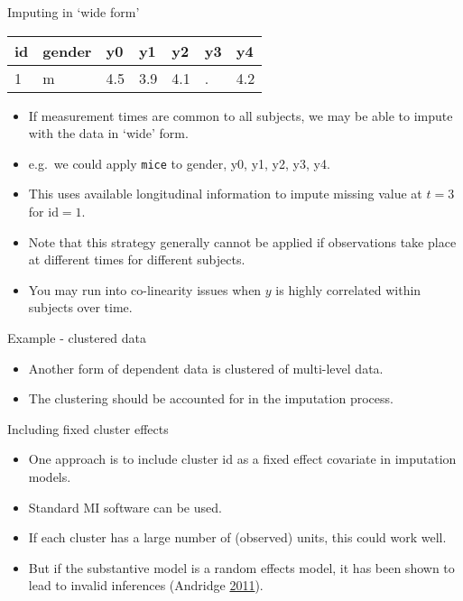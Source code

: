 \documentclass[ignorenonframetext,]{beamer}
\providecommand{\tightlist}{%
  \setlength{\itemsep}{0pt}\setlength{\parskip}{0pt}}
\begin{document}
\begin{frame}[fragile]{Imputing in `wide form'}
\protect\hypertarget{imputing-in-wide-form}{}

\begin{longtable}[]{@{}lllllll@{}}
\toprule
id & gender & y0 & y1 & y2 & y3 & y4\tabularnewline
\midrule
\endhead
1 & m & 4.5 & 3.9 & 4.1 & . & 4.2\tabularnewline
\bottomrule
\end{longtable}

\begin{itemize}
\tightlist
\item
  If measurement times are common to all subjects, we may be able to
  impute with the data in `wide' form.
\item
  e.g.~we could apply \texttt{mice} to gender, y0, y1, y2, y3, y4.
\item
  This uses available longitudinal information to impute missing value
  at \(t=3\) for \(\mbox{id}=1\).
\item
  Note that this strategy generally cannot be applied if observations
  take place at different times for different subjects.
\item
  You may run into co-linearity issues when \(y\) is highly correlated
  within subjects over time.
\end{itemize}

\end{frame}

\begin{frame}{Example - clustered data}
\protect\hypertarget{example---clustered-data}{}

\begin{itemize}
\tightlist
\item
  Another form of dependent data is clustered of multi-level data.
\item
  The clustering should be accounted for in the imputation process.
\end{itemize}

\end{frame}

\begin{frame}{Including fixed cluster effects}
\protect\hypertarget{including-fixed-cluster-effects}{}

\begin{itemize}
\tightlist
\item
  One approach is to include cluster id as a fixed effect covariate in
  imputation models.
\item
  Standard MI software can be used.
\item
  If each cluster has a large number of (observed) units, this could
  work well.
\item
  But if the substantive model is a random effects model, it has been
  shown to lead to invalid inferences (Andridge
  \protect\hyperlink{ref-Andridge2011}{2011}).
\end{itemize}

\end{frame}
\end{document}
